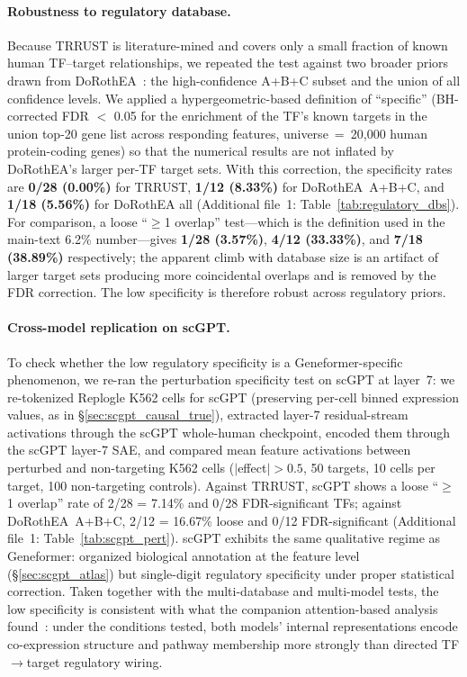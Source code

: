\documentclass[onecolumn]{article}
\begin{document}
\paragraph{Robustness to regulatory database.} Because TRRUST is literature-mined and covers only a small fraction of known human TF--target relationships, we repeated the test against two broader priors drawn from DoRothEA~\cite{garcia-alonso2019dorothea}: the high-confidence A+B+C subset and the union of all confidence levels. We applied a hypergeometric-based definition of ``specific'' (BH-corrected FDR $<$ 0.05 for the enrichment of the TF's known targets in the union top-20 gene list across responding features, universe~=~20{,}000 human protein-coding genes) so that the numerical results are not inflated by DoRothEA's larger per-TF target sets. With this correction, the specificity rates are \textbf{0/28 (0.00\%)} for TRRUST, \textbf{1/12 (8.33\%)} for DoRothEA~A+B+C, and \textbf{1/18 (5.56\%)} for DoRothEA all (Additional file~1: Table~\ref{tab:regulatory_dbs}). For comparison, a loose ``$\geq$1 overlap'' test---which is the definition used in the main-text 6.2\% number---gives \textbf{1/28 (3.57\%)}, \textbf{4/12 (33.33\%)}, and \textbf{7/18 (38.89\%)} respectively; the apparent climb with database size is an artifact of larger target sets producing more coincidental overlaps and is removed by the FDR correction. The low specificity is therefore robust across regulatory priors.

\paragraph{Cross-model replication on scGPT.} To check whether the low regulatory specificity is a Geneformer-specific phenomenon, we re-ran the perturbation specificity test on scGPT at layer~7: we re-tokenized Replogle K562 cells for scGPT (preserving per-cell binned expression values, as in \S\ref{sec:scgpt_causal_true}), extracted layer-7 residual-stream activations through the scGPT whole-human checkpoint, encoded them through the scGPT layer-7 SAE, and compared mean feature activations between perturbed and non-targeting K562 cells ($|$effect$|>0.5$, 50 targets, 10 cells per target, 100 non-targeting controls). Against TRRUST, scGPT shows a loose ``$\geq$1 overlap'' rate of 2/28 = 7.14\% and 0/28 FDR-significant TFs; against DoRothEA~A+B+C, 2/12 = 16.67\% loose and 0/12 FDR-significant (Additional file~1: Table~\ref{tab:scgpt_pert}). scGPT exhibits the same qualitative regime as Geneformer: organized biological annotation at the feature level (\S\ref{sec:scgpt_atlas}) but single-digit regulatory specificity under proper statistical correction. Taken together with the multi-database and multi-model tests, the low specificity is consistent with what the companion attention-based analysis found~\cite{kendiukhov2025systematic}: under the conditions tested, both models' internal representations encode co-expression structure and pathway membership more strongly than directed TF$\to$target regulatory wiring.
\end{document}
